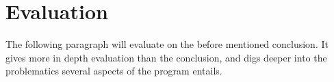 \section{Evaluation}
\label{sec:eval}

The following paragraph will evaluate on the before mentioned conclusion. It gives more in depth evaluation than the conclusion, and digs deeper into the problematics several aspects of the program entails.





